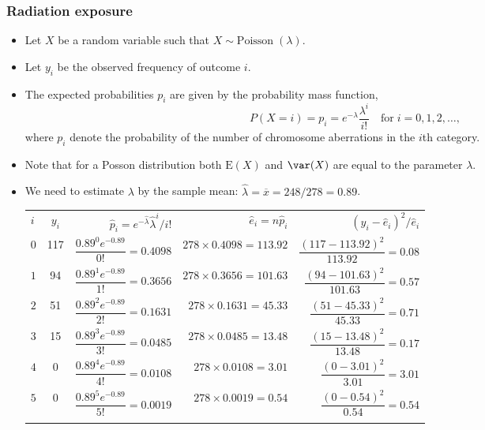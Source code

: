 \documentclass[a4paper]{article}
\begin{document}
\subsubsection{Radiation exposure}
\begin{itemize}
	\item Let \( X \) be a random variable such that \( X \sim \text{Poisson}\;(\lambda) \).
	\item Let \( y_i \) be the observed frequency of outcome \( i \).
	\item The expected probabilities \( p_i \) are given by the probability mass function,
	\[
		P(X = i) = p_i = e^{-\lambda} \frac{\lambda^i}{i!} \quad\text{for}\; i = 0,1,2,\dotsc,
	\]
	where \( p_i \) denote the probability of the number of chromosome aberrations in the \( i \)th category.
	\item Note that for a Posson distribution both \( \mathrm{\mathrm{E}}(X) \) and \( \var(X) \) are equal to the parameter \( \lambda \).
	\item We need to estimate \( \lambda \) by the sample mean: \( \hat{\lambda} = \overline{x} = 248 / 278 = 0.89 \).
	\begin{table}[H]
		\centering
		\begin{tabular}{@{}l|crrr@{}}
		\toprule
		\( i \) & \( y_i \) &  \( \hat p_i=e^{- \hat{\lambda}}\hat{\lambda}^i /i! \) & \( \hat{e}_i = n\hat{p}_i \) & \( (y_i-\hat{e}_{i})^2/\hat{e}_{i} \) \\ \addlinespace[0.5em] \midrule  
		\( 0 \) &  117 &  \( \dfrac{0.89^0 e^{-0.89}}{0!} = 0.4098 \) & \( 278 \times 0.4098 = 113.92 \) & \( \dfrac{(117-113.92)^2}{113.92} = 0.08 \)  \\  \addlinespace[0.5em] 
		\( 1 \) &  94  &  \( \dfrac{0.89^1 e^{-0.89}}{1!} = 0.3656 \) & \( 278 \times 0.3656 = 101.63 \) & \( \dfrac{(94-101.63)^2}{101.63} = 0.57 \)    \\  \addlinespace[0.5em]
		\( 2 \) &  51  &  \( \dfrac{0.89^2 e^{-0.89}}{2!} = 0.1631 \) & \( 278 \times 0.1631 = 45.33 \) & \( \dfrac{(51-45.33)^2}{45.33} = 0.71 \)  \\ \addlinespace[0.5em]   
		\( 3 \) &    15  &  \( \dfrac{0.89^3 e^{-0.89}}{3!} = 0.0485 \) & \( 278 \times 0.0485 = 13.48 \) & \( \dfrac{(15-13.48)^2}{13.48} = 0.17 \)  \\ \addlinespace[0.5em]   
		\( 4 \) &    0     &  \( \dfrac{0.89^4 e^{-0.89}}{4!} = 0.0108 \) & \( 278 \times 0.0108 = 3.01 \) & \( \dfrac{(0-3.01)^2}{3.01} = 3.01 \)  \\ \addlinespace[0.5em]  
		\( 5 \) &    0     &  \( \dfrac{0.89^5 e^{-0.89}}{5!} = 0.0019 \)& \( 278 \times 0.0019 = 0.54 \) & \( \dfrac{(0-0.54)^2}{0.54} = 0.54 \)  \\ \addlinespace[0.5em]  

\end{tabular}
\end{table}
\end{itemize}
\end{document}
